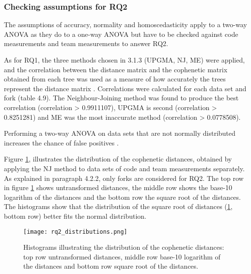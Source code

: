 \subsubsection{Checking assumptions for RQ2}
The assumptions of accuracy, normality and homoscedasticity apply to a two-way ANOVA as they do to a one-way ANOVA \citep[p.176]{McDonald2014b} but have to be checked against code measurements and team measurements to answer RQ2.


\noindent
As for RQ1, the three methods chosen in 3.1.3 (UPGMA, NJ, ME) were applied, and the correlation between the distance matrix and the cophenetic matrix obtained from each tree was used as a measure of how accurately the trees represent the distance matrix \citep{Rohlf2013a}. Correlations were calculated for each data set and fork (table 4.9). The Neighbour-Joining method was found to produce the best correlation (correlation > 0.9911107), UPGMA is second (correlation > 0.8251281) and ME was the most inaccurate method (correlation > 0.0778508).


\noindent
Performing a two-way ANOVA on data sets that are not normally distributed increases the chance of false positives \citep[p.176]{McDonald2014b}.

Figure \ref{fig:rq2_distributions}, illustrates the distribution of the cophenetic distances, obtained by applying the NJ method to data sets of code and team measurements separately. As explained in paragraph 4.2.2, only forks are considered for RQ2. The top row in figure \ref{fig:rq2_distributions} shows untransformed distances, the middle row shows the base-10 logarithm of the distances and the bottom row the square root of the distances. The histograms show that the distribution of the square root of distances (\ref{fig:rq2_distributions}, bottom row) better fits the normal distribution.

\begin{figure}[H]
  \centering
  \texttt{[image: rq2\_distributions.png]}
  \caption{Histograms illustrating the distribution of the cophenetic distances: top row untransformed distances, middle row base-10 logarithm of the distances and bottom row square root of the distances.}
  \label{fig:rq2_distributions}
\end{figure}


